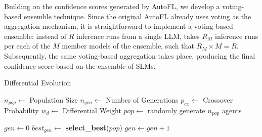 Building on the confidence scores generated by AutoFL, we develop a voting-based ensemble technique. Since the original AutoFL already uses voting as the aggregation mechanism, it is straightforward to implement a voting-based ensemble: instead of $R$ inference runs from a single LLM, \cosmosfl takes $R_M$ inference runs per each of the $M$ member models of the ensemble, such that $R_M \times M = R$. Subsequently, the same voting-based aggregation takes place, producing the final confidence score based on the ensemble of SLMs.


\begin{algorithm}
\caption{Differential Evolution\label{alg:de}}

$n_{pop} \gets$ Population Size\;
$n_{gen} \gets$ Number of Generations\;
$p_{cx} \gets$ Crossover Probability\;
$w_{d} \gets$ Differential Weight\;
$pop \gets$ randomly generate $n_{pop}$ agents\;

$gen \gets 0$\;
 {
    $best_{gen} \gets$ \textbf{select\_best}($pop$)\;
    $gen\gets gen + 1$\;
}
\end{algorithm}

